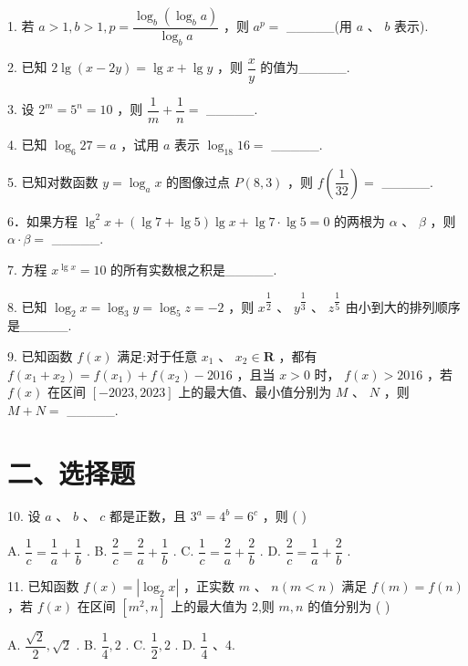 1. 若 $a > 1,b > 1,p = \dfrac{{\log }_{b}\left( {{\log }_{b}a}\right) }{{\log }_{b}a}$ ，则 ${a}^{p} =$ \_\_\_\_\_(用 $a$ 、 $b$ 表示).

2. 已知 $2\lg \left( {x - {2y}}\right)  = \lg x + \lg y$ ，则 $\dfrac{x}{y}$ 的值为\_\_\_\_\_.

3. 设 ${2}^{m} = {5}^{n} = {10}$ ，则 $\dfrac{1}{m} + \dfrac{1}{n} =$ \_\_\_\_\_.

4. 已知 ${\log }_{6}{27} = a$ ，试用 $a$ 表示 ${\log }_{18}{16} =$ \_\_\_\_\_.

5. 已知对数函数 $y = {\log }_{a}x$ 的图像过点 $P\left( {8,3}\right)$ ，则 $f\left( \dfrac{1}{32}\right)  =$ \_\_\_\_\_.

6．如果方程 ${\lg }^{2}x + \left( {\lg 7 + \lg 5}\right) \lg x + \lg 7 \cdot  \lg 5 = 0$ 的两根为 $\alpha$ 、 $\beta$ ，则 $\alpha  \cdot  \beta  =$ \_\_\_\_\_.

7. 方程 ${x}^{\lg x} = {10}$ 的所有实数根之积是\_\_\_\_\_.

8. 已知 ${\log }_{2}x = {\log }_{3}y = {\log }_{5}z =  - 2$ ，则 ${x}^{\dfrac{1}{2}}$ 、 ${y}^{\dfrac{1}{3}}$ 、 ${z}^{\dfrac{1}{5}}$ 由小到大的排列顺序是\_\_\_\_\_.

9. 已知函数 $f\left( x\right)$ 满足:对于任意 ${x}_{1}$ 、 ${x}_{2} \in  \mathbf{R}$ ，都有 $f\left( {{x}_{1} + {x}_{2}}\right)  = f\left( {x}_{1}\right)  + f\left( {x}_{2}\right)  - {2016}$ ，且当 $x > 0$ 时， $f\left( x\right)  > {2016}$ ，若 $f\left( x\right)$ 在区间 $\left\lbrack  {-{2023},{2023}}\right\rbrack$ 上的最大值、最小值分别为 $M$ 、 $N$ ，则 $M + N =$ \_\_\_\_\_.

\section*{二、选择题}

10. 设 $a$ 、 $b$ 、 $c$ 都是正数，且 ${3}^{a} = {4}^{b} = {6}^{c}$ ，则 ( )

A. $\dfrac{1}{c} = \dfrac{1}{a} + \dfrac{1}{b}$ . B. $\dfrac{2}{c} = \dfrac{2}{a} + \dfrac{1}{b}$ . C. $\dfrac{1}{c} = \dfrac{2}{a} + \dfrac{2}{b}$ . D. $\dfrac{2}{c} = \dfrac{1}{a} + \dfrac{2}{b}$ .

11. 已知函数 $f\left( x\right)  = \left| {{\log }_{2}x}\right|$ ，正实数 $m$ 、 $n\left( {m < n}\right)$ 满足 $f\left( m\right)  = f\left( n\right)$ ，若 $f\left( x\right)$ 在区间 $\left\lbrack  {{m}^{2},n}\right\rbrack$ 上的最大值为 2,则 $m,n$ 的值分别为 ( )

A. $\dfrac{\sqrt{2}}{2},\sqrt{2}$ . B. $\dfrac{1}{4},2$ . C. $\dfrac{1}{2},2$ . D. $\dfrac{1}{4}$ 、4.

